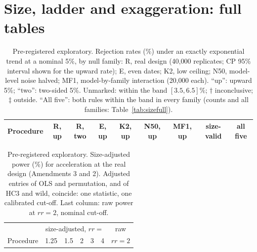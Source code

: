 \documentclass[aps,pre,twocolumn,superscriptaddress,nofootinbib,9pt]{revtex4-2}
\newcommand{\rr}{rr}
\begin{document}
\section{Size, ladder and exaggeration: full tables}\label{sup:tables}
\begin{table}[tb]
\caption{Pre-registered exploratory. Rejection rates (\%) under an exactly exponential trend at a nominal 5\%, by null family: R, real design (40{,}000 replicates; CP 95\% interval shown for the upward rate); E, even dates; K2, low ceiling; N50, model-level noise halved; MF1, model-by-family interaction (20{,}000 each). ``up'': upward 5\%; ``two'': two-sided 5\%. Unmarked: within the band $[3.5,6.5]\%$; $\dagger$ inconclusive; $\ddagger$ outside. ``All five'': both rules within the band in every family (counts and all families: Table~\ref{tab:sizefull}).}
\label{tab:size}
\begin{ruledtabular}
\begin{tabular}{lcccccccc}
Procedure & R, up & R, two & E, up & K2, up & N50, up & MF1, up & size-valid & all five \\
\hline

\end{tabular}
\end{ruledtabular}
\end{table}

\begin{table}[tb]
\caption{Pre-registered exploratory. Size-adjusted power (\%) for acceleration at the real design (Amendments 3 and 2). Adjusted entries of OLS and permutation, and of HC3 and wild, coincide: one statistic, one calibrated cut-off. Last column: raw power at $\rr=2$, nominal cut-off.}
\label{tab:power}
\begin{ruledtabular}
\begin{tabular}{lcccccc}
 & \multicolumn{5}{c}{size-adjusted, $\rr=$} & raw \\
Procedure & 1.25 & 1.5 & 2 & 3 & 4 & $\rr=2$ \\
\hline

\end{tabular}
\end{ruledtabular}
\end{table}
\end{document}
